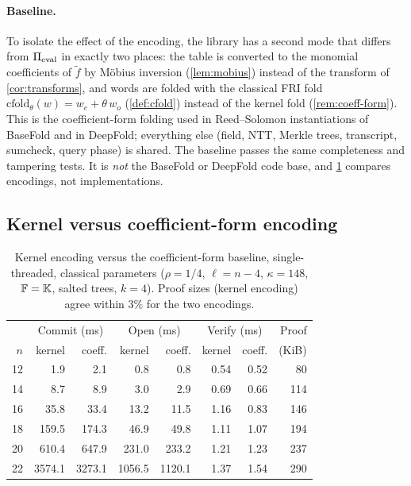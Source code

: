\paragraph{Baseline.}
To isolate the effect of the encoding, the library has a second mode that differs from $\Pi_{\mathrm{eval}}$ in exactly two places: the table is converted to the monomial coefficients of $\tilde f$ by M\"obius inversion (\cref{lem:mobius}) instead of the transform of \cref{cor:transforms}, and words are folded with the classical FRI fold $\mathrm{cfold}_\theta(w) = w_e + \theta\,w_o$ (\cref{def:cfold}) instead of the kernel fold (\cref{rem:coeff-form}).
This is the coefficient-form folding used in Reed--Solomon instantiations of BaseFold and in DeepFold; everything else (field, NTT, Merkle trees, transcript, sumcheck, query phase) is shared.
The baseline passes the same completeness and tampering tests.
It is \emph{not} the BaseFold or DeepFold code base, and \cref{tab:scaling} compares encodings, not implementations.

\subsection{Kernel versus coefficient-form encoding}\label{sec:exp:scaling}

\begin{table}[t]
\centering
\small
\begin{tabular}{r rr rr rr r}
\toprule
 & \multicolumn{2}{c}{Commit (ms)} & \multicolumn{2}{c}{Open (ms)} & \multicolumn{2}{c}{Verify (ms)} & Proof \\
$n$ & kernel & coeff. & kernel & coeff. & kernel & coeff. & (KiB) \\
\midrule
12 & 1.9 & 2.1 & 0.8 & 0.8 & 0.54 & 0.52 & 80 \\
14 & 8.7 & 8.9 & 3.0 & 2.9 & 0.69 & 0.66 & 114 \\
16 & 35.8 & 33.4 & 13.2 & 11.5 & 1.16 & 0.83 & 146 \\
18 & 159.5 & 174.3 & 46.9 & 49.8 & 1.11 & 1.07 & 194 \\
20 & 610.4 & 647.9 & 231.0 & 233.2 & 1.21 & 1.23 & 237 \\
22 & 3574.1 & 3273.1 & 1056.5 & 1120.1 & 1.37 & 1.54 & 290 \\
\bottomrule
\end{tabular}
\caption{Kernel encoding versus the coefficient-form baseline, single-threaded, classical parameters ($\rho = 1/4$, $\ell = n-4$, $\kappa = 148$, $\mathbb{F} = \mathbb{K}$, salted trees, $k = 4$). Proof sizes (kernel encoding) agree within $3\%$ for the two encodings.}
\label{tab:scaling}
\end{table}

